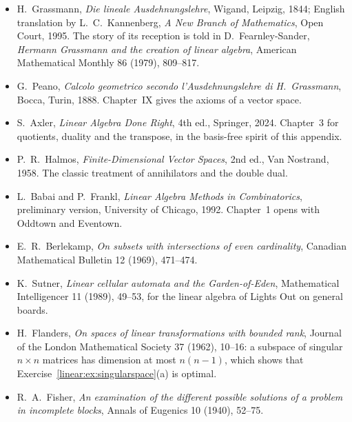 \begin{itemize}
\item H.~Grassmann, \emph{Die lineale Ausdehnungslehre}, Wigand, Leipzig, 1844; English translation by L.~C.~Kannenberg,
\emph{A New Branch of Mathematics}, Open Court, 1995. The story of its reception is told in D.~Fearnley-Sander,
\emph{Hermann Grassmann and the creation of linear algebra}, American Mathematical Monthly 86 (1979), 809--817.
\item G.~Peano, \emph{Calcolo geometrico secondo l'Ausdehnungslehre di H.~Grassmann}, Bocca, Turin, 1888. Chapter~IX gives
the axioms of a vector space.
\item S.~Axler, \emph{Linear Algebra Done Right}, 4th ed., Springer, 2024. Chapter~3 for quotients, duality and the
transpose, in the basis-free spirit of this appendix.
\item P.~R.~Halmos, \emph{Finite-Dimensional Vector Spaces}, 2nd ed., Van Nostrand, 1958. The classic treatment of
annihilators and the double dual.
\item L.~Babai and P.~Frankl, \emph{Linear Algebra Methods in Combinatorics}, preliminary version, University of Chicago,
1992. Chapter~1 opens with Oddtown and Eventown.
\item E.~R.~Berlekamp, \emph{On subsets with intersections of even cardinality}, Canadian Mathematical Bulletin 12 (1969),
471--474.
\item K.~Sutner, \emph{Linear cellular automata and the Garden-of-Eden}, Mathematical Intelligencer 11 (1989), 49--53, for
the linear algebra of Lights Out on general boards.
\item H.~Flanders, \emph{On spaces of linear transformations with bounded rank}, Journal of the London Mathematical Society
37 (1962), 10--16: a subspace of singular $n\times n$ matrices has dimension at most $n(n-1)$, which shows that
Exercise~\ref{linear:ex:singularspace}(a) is optimal.
\item R.~A.~Fisher, \emph{An examination of the different possible solutions of a problem in incomplete blocks}, Annals of
Eugenics 10 (1940), 52--75.
\end{itemize}
